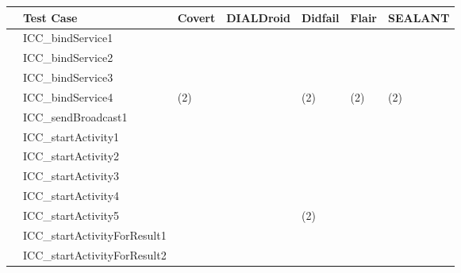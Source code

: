 \documentclass{article}
\begin{document}
\begin{table}
\newcommand{\tp}{\textbf{\normalsize{\textcolor{trueColor}{\CheckedBox}}}}
\newcommand{\fp}{\normalsize{\textcolor{falseColor}{\XBox}}}
\newcommand{\fn}{\normalsize{\textcolor{falseColor}{\Square}}}


\scriptsize
\centering
	\vspace{+0.3cm}
	\begin{tabular}{|p{0.07cm}|l|l|l|l|l|p{1.3cm}|}
		\hline
		& Test Case & Covert & DIALDroid &  Didfail & Flair & SEALANT \\ %
		\hline
		\hline
		\parbox[t]{2mm}{}
		&ICC\_bindService1    &\tp &\tp &\fp \fn	 &\tp	&\tp		\\
		&ICC\_bindService2    &\tp &\fn	&\fn &\tp &\tp			\\
		&ICC\_bindService3    &\tp &\fn	&\fn &\tp &\tp			\\
		&ICC\_bindService4    &\scriptsize (\tp \scriptsize 2)	&\tp \fn &\fp \scriptsize (\fn \scriptsize 2) &\scriptsize (\tp \scriptsize 2)	 &\scriptsize (\tp \scriptsize 2)	\\
		&ICC\_sendBroadcast1  &\tp &\tp &\tp &\tp &\tp \\
		&ICC\_startActivity1  &\tp &\tp &\fn &\tp &\fn \\
		&ICC\_startActivity2  &\tp	&\tp	&\fn	&\tp &\tp \\
		&ICC\_startActivity3  &\tp	&\tp	&\fn	&\tp &\tp \\
		&ICC\_startActivity4  & 	&	&\fp &	& 	\\
		&ICC\_startActivity5  &	&	&\scriptsize (\fp \scriptsize 2) & &	\\
		&ICC\_startActivityForResult1 	&\tp	&\tp &\fn &\tp	&\tp\\
		&ICC\_startActivityForResult2 &\tp &\tp &\fn &\tp &\tp\\

\end{tabular}
\end{table}
\end{document}
